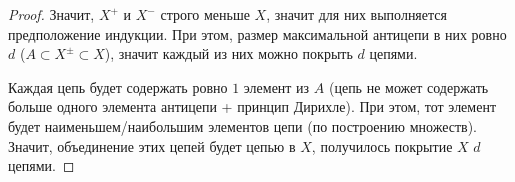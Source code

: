 \begin{theorem}
\begin{proof}
        Значит, $X^{+}$ и $X^{-}$ строго меньше $X$, значит для них выполняется предположение индукции. При этом, размер максимальной антицепи в них ровно $d$ ($A \subset X^{\pm} \subset X$), значит каждый из них можно покрыть $d$ цепями.

        Каждая цепь будет содержать ровно $1$ элемент из $A$ (цепь не может содержать больше одного элемента антицепи + принцип Дирихле). При этом, тот элемент будет наименьшем/наибольшим элементов цепи (по построению множеств). Значит, объединение этих цепей будет цепью в $X$, получилось покрытие $X$ $d$ цепями.
    \end{proof}
\end{theorem}
